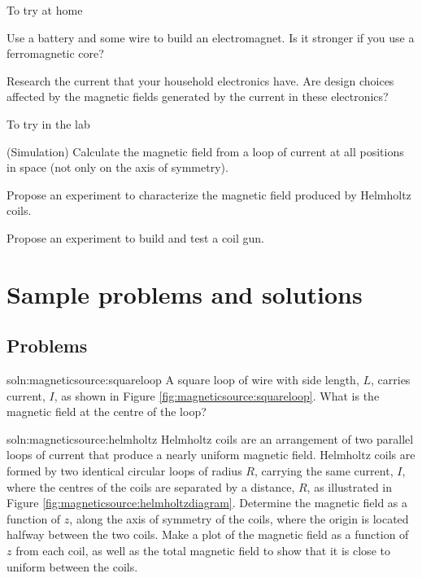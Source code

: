 \begin{chapteractivity}{To try at home}
{
\item Use a battery and some wire to build an electromagnet. Is it stronger if you use a ferromagnetic core?
\item Research the current that your household electronics have. Are design choices affected by the magnetic fields generated by the current in these electronics?
}
\end{chapteractivity}

\begin{chapteractivity}{To try in the lab}
{
\item (Simulation) Calculate the magnetic field from a loop of current at all positions in space (not only on the axis of symmetry). 
\item Propose an experiment to characterize the magnetic field produced by Helmholtz coils.
\item Propose an experiment to build and test a coil gun.
}
\end{chapteractivity}

\newpage
\section{Sample problems and solutions}
\subsection{Problems}
\begin{problem}{soln:magneticsource:squareloop}
{\label{prob:magneticsource:squareloop} 
A square loop of wire with side length, $L$, carries current, $I$, as shown in Figure \ref{fig:magneticsource:squareloop}. What is the magnetic field at the centre of the loop?
}
\end{problem}

\begin{problem}{soln:magneticsource:helmholtz}{\label{prob:magneticsource:helmholtz} 
Helmholtz coils are an arrangement of two parallel loops of current that produce a nearly uniform magnetic field. Helmholtz coils are formed by two identical circular loops of radius $R$, carrying the same current, $I$, where the centres of the coils are separated by a distance, $R$, as illustrated in Figure \ref{fig:magneticsource:helmholtzdiagram}. Determine the magnetic field as a function of $z$, along the axis of symmetry of the coils, where the origin is located halfway between the two coils. Make a plot of the magnetic field as a function of $z$ from each coil, as well as the total magnetic field to show that it is close to uniform between the coils.
}
\end{problem}


